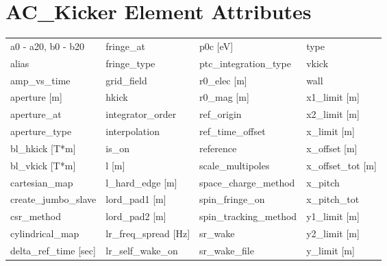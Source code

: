  \section{AC_Kicker Element Attributes}
 \label{s:list.ac.kicker}
 
 \begin{tabular}{llll} \toprule
a0 - a20, b0 - b20             & fringe_at                      & p0c [eV]                       & type                           \\
alias                          & fringe_type                    & ptc_integration_type           & vkick                          \\
amp_vs_time                    & grid_field                     & r0_elec [m]                    & wall                           \\
aperture [m]                   & hkick                          & r0_mag [m]                     & x1_limit [m]                   \\
aperture_at                    & integrator_order               & ref_origin                     & x2_limit [m]                   \\
aperture_type                  & interpolation                  & ref_time_offset                & x_limit [m]                    \\
bl_hkick [T*m]                 & is_on                          & reference                      & x_offset [m]                   \\
bl_vkick [T*m]                 & l [m]                          & scale_multipoles               & x_offset_tot [m]               \\
cartesian_map                  & l_hard_edge [m]                & space_charge_method            & x_pitch                        \\
create_jumbo_slave             & lord_pad1 [m]                  & spin_fringe_on                 & x_pitch_tot                    \\
csr_method                     & lord_pad2 [m]                  & spin_tracking_method           & y1_limit [m]                   \\
cylindrical_map                & lr_freq_spread [Hz]            & sr_wake                        & y2_limit [m]                   \\
delta_ref_time [sec]           & lr_self_wake_on                & sr_wake_file                   & y_limit [m]                    \\

\end{tabular}
